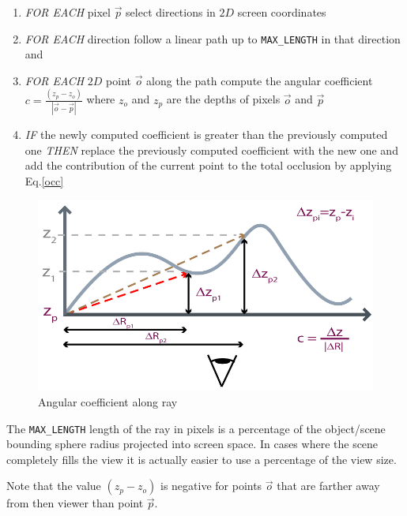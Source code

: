 \documentclass{article}
\begin{document}
\begin{enumerate}
\item \textit{FOR EACH} pixel $\vec{p}$ select directions in $2D$ screen coordinates
\item \textit{FOR EACH} direction follow a linear path up to \texttt{MAX\_LENGTH} in that direction and
\item \textit{FOR EACH} $2D$ point $\vec{o}$ along the path compute the angular coefficient
      $c = \frac{\left(z_{p} - z_{o}\right)}{\left|\vec{o} - \vec{p}\right|}$ where
      $z_{o}$ and $z_{p}$ are the depths of pixels $\vec{o}$ and $\vec{p}$ 
\item \textit{IF} the newly computed coefficient is greater than the previously computed one
      \textit{THEN} replace the previously computed coefficient with the new one and add the contribution
      of the current point to the total occlusion by applying Eq.\eqref{occ}
\end{enumerate}


\begin{figure}[!ht]
\caption{Angular coefficient along ray}
\begin{center}
\includegraphics{images/SSAO-angularcoeff.png}
\end{center}
\label{ssaoangularcoeff}
\end{figure}

The \texttt{MAX\_LENGTH} length of the ray in pixels is a percentage of the object/scene bounding sphere radius projected into screen space.
In cases where the scene completely fills the view it is actually easier to use a percentage of the view size. 

Note that the value $\left(z_{p} - z_{o}\right)$ is negative for points $\vec{o}$ that are farther away 
from then viewer than point $\vec{p}$.
\end{document}
